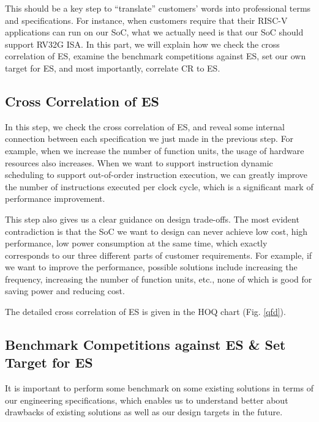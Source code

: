 This should be a key step to ``translate'' customers' words into professional terms and specifications. For instance, when customers require that their RISC-V applications can run on our SoC, what we actually need is that our SoC should support RV32G ISA. In this part, we will explain how we check the cross correlation of ES, examine the benchmark competitions against ES, set our own target for ES, and most importantly, correlate CR to ES.


\subsection{Cross Correlation of ES}
In this step, we check the cross correlation of ES, and reveal some internal connection between each specification we just made in the previous step. For example, when we increase the number of function units, the usage of hardware resources also increases. When we want to support instruction dynamic scheduling to support out-of-order instruction execution, we can greatly improve the number of instructions executed per clock cycle, which is a significant mark of performance improvement.

This step also gives us a clear guidance on design trade-offs. The most evident contradiction is that the SoC we want to design can never achieve low cost, high performance, low power consumption at the same time, which exactly corresponds to our three different parts of customer requirements. For example, if we want to improve the performance, possible solutions include increasing the frequency, increasing the number of function units, etc., none of which is good for saving power and reducing cost.


The detailed cross correlation of ES is given in the HOQ chart (Fig. \ref{qfd}).


\subsection{Benchmark Competitions against ES \& Set Target for ES}
It is important to perform some benchmark on some existing solutions in terms of our engineering specifications, which enables us to understand better about drawbacks of existing solutions as well as our design targets in the future.

